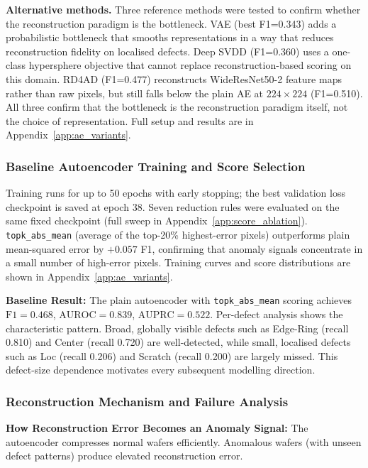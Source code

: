 \documentclass[11pt]{article}
\begin{document}
\textbf{Alternative methods.} Three reference methods were tested to confirm whether the reconstruction paradigm is the bottleneck. VAE (best F1=0.343) adds a probabilistic bottleneck that smooths representations in a way that reduces reconstruction fidelity on localised defects. Deep SVDD (F1=0.360) uses a one-class hypersphere objective that cannot replace reconstruction-based scoring on this domain. RD4AD (F1=0.477) reconstructs WideResNet50-2 feature maps rather than raw pixels, but still falls below the plain AE at $224\!\times\!224$ (F1=0.510). All three confirm that the bottleneck is the reconstruction paradigm itself, not the choice of representation. Full setup and results are in Appendix~\ref{app:ae_variants}.

\subsubsection{Baseline Autoencoder Training and Score Selection}

Training runs for up to 50 epochs with early stopping; the best validation loss checkpoint is saved at epoch 38. Seven reduction rules were evaluated on the same fixed checkpoint (full sweep in Appendix~\ref{app:score_ablation}). \texttt{topk\_abs\_mean} (average of the top-20\% highest-error pixels) outperforms plain mean-squared error by $+0.057$ F1, confirming that anomaly signals concentrate in a small number of high-error pixels. Training curves and score distributions are shown in Appendix~\ref{app:ae_variants}.

\textbf{Baseline Result:} The plain autoencoder with \texttt{topk\_abs\_mean} scoring achieves
$\mathrm{F1}=0.468$, $\mathrm{AUROC}=0.839$, $\mathrm{AUPRC}=0.522$.
Per-defect analysis shows the characteristic pattern. Broad, globally visible defects such
as Edge-Ring (recall 0.810) and Center (recall 0.720) are well-detected,
while small, localised defects such as Loc (recall 0.206) and Scratch
(recall 0.200) are largely missed. This defect-size dependence motivates every
subsequent modelling direction.

\subsubsection{Reconstruction Mechanism and Failure Analysis}

\textbf{How Reconstruction Error Becomes an Anomaly Signal:} The autoencoder compresses normal wafers efficiently.
Anomalous wafers (with unseen defect patterns) produce elevated reconstruction error.
\end{document}
